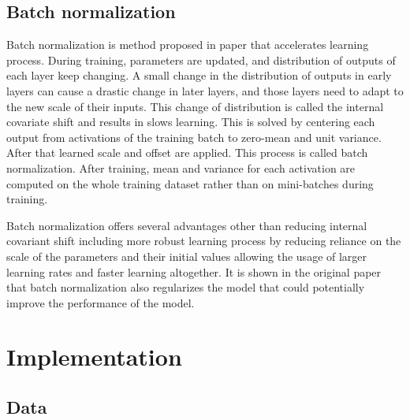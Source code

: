 \documentclass[times, utf8, diplomski, numeric, english]{fer}
\begin{document}
\section{Batch normalization}
Batch normalization is method proposed in paper\cite{BNORM} that accelerates learning process. 
During training, parameters are updated, and distribution of outputs of each layer keep changing. A small change in the distribution of outputs in early layers can cause a drastic change in later layers, and those layers need to adapt to the new scale of their inputs. This change of distribution is called the internal covariate shift and results in slows learning.
This is solved by centering each output from activations of the training batch to zero-mean and unit variance. After that learned scale and offset are applied. This process is called batch normalization. 
After training, mean and variance for each activation are computed on the whole training dataset rather than on mini-batches during training. 

Batch normalization offers several advantages other than reducing internal covariant shift including more robust learning process by reducing reliance on the scale of the parameters and their initial values allowing the usage of larger learning rates and faster learning altogether. It is shown in the original paper that batch normalization also regularizes the model that could potentially improve the performance of the model.

\chapter{Implementation}


\section{Data}
\end{document}
